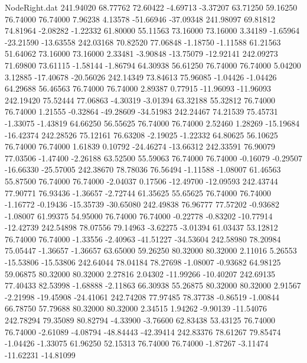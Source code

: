 \begin{filecontents}{NodeRight.dat}
 241.94020   68.77762   72.60422    -4.69713   -3.37207   63.71250   59.16250   76.74000   76.74000    7.96238    4.13578  -51.66946  -37.09348
 241.98097   69.81812   74.81964    -2.08282   -1.22332   61.80000   55.11563   73.16000   73.16000    3.34189   -1.65964  -23.21590  -13.63558
 242.03168   70.82520   77.06848    -1.18750   -1.11588   61.21563   51.64062   73.16000   73.16000    2.33481   -3.90848  -13.75079  -12.92141
 242.09273   71.69800   73.61115    -1.58144   -1.86794   64.30938   56.61250   76.74000   76.74000    5.04200    3.12885  -17.40678  -20.56026
 242.14349   73.84613   75.96085    -1.04426   -1.04426   64.29688   56.46563   76.74000   76.74000    2.89387    0.77915  -11.96093  -11.96093
 242.19420   75.52444   77.06863    -4.30319   -3.01394   63.32188   55.32812   76.74000   76.74000    1.21555   -0.32864  -49.28609  -34.51983
 242.24467   74.21539   75.45731    -1.33075   -1.43819   64.66250   56.55625   76.74000   76.74000    2.52460    1.28269  -15.19684  -16.42374
 242.28526   75.12161   76.63208    -2.19025   -1.22332   64.80625   56.10625   76.74000   76.74000    1.61839    0.10792  -24.46274  -13.66312
 242.33591   76.90079   77.03506    -1.47400   -2.26188   63.52500   55.59063   76.74000   76.74000   -0.16079   -0.29507  -16.66330  -25.57005
 242.38670   78.78036   76.56494    -1.11588   -1.08007   61.46563   55.87500   76.74000   76.74000   -2.04037    0.17506  -12.49700  -12.09593
 242.43744   77.90771   76.93436    -1.36657   -2.72744   61.35625   55.65625   76.74000   76.74000   -1.16772   -0.19436  -15.35739  -30.65080
 242.49838   76.96777   77.57202    -0.93682   -1.08007   61.99375   54.95000   76.74000   76.74000   -0.22778   -0.83202  -10.77914  -12.42739
 242.54898   78.07556   79.14963    -3.62275   -3.01394   61.03437   53.12812   76.74000   76.74000   -1.33556   -2.40963  -41.51227  -34.53604
 242.58980   78.20984   75.05447    -1.36657   -1.36657   63.65000   59.26250   80.32000   80.32000    2.11016    5.26553  -15.53806  -15.53806
 242.64044   78.04184   78.27698    -1.08007   -0.93682   64.98125   59.06875   80.32000   80.32000    2.27816    2.04302  -11.99266  -10.40207
 242.69135   77.40433   82.53998    -1.68888   -2.11863   66.30938   55.26875   80.32000   80.32000    2.91567   -2.21998  -19.45908  -24.41061
 242.74208   77.97485   78.37738    -0.86519   -1.00844   66.78750   57.79688   80.32000   80.32000    2.34515    1.94262   -9.90139  -11.54076
 242.78294   79.35089   80.82794    -4.33900   -3.76600   62.83438   53.43125   76.74000   76.74000   -2.61089   -4.08794  -48.84443  -42.39414
 242.83376   78.61267   79.85474    -1.04426   -1.33075   61.96250   52.15313   76.74000   76.74000   -1.87267   -3.11474  -11.62231  -14.81099

\end{filecontents}
